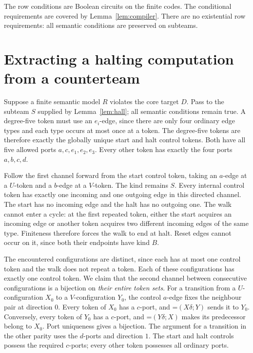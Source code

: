 \documentclass[11pt,a4paper]{article}
\newcommand{\dep}[2]{\mathord{=}(#1;#2)}
\theoremstyle{definition}
\begin{document}
The row conditions are Boolean circuits on the finite codes. The
conditional requirements are covered by Lemma~\ref{lem:compiler}.
There are no existential row requirements: all semantic conditions
are preserved on subteams.

\section{Extracting a halting computation from a counterteam}
\label{sec:soundness}
Suppose a finite semantic model $R$ violates the core target $D$.
Pass to the subteam $S$ supplied by Lemma~\ref{lem:hall}; all semantic
conditions remain true. A degree-five token must use an $e_i$-edge,
since there are only four ordinary edge types and each type occurs
at most once at a token. The degree-five tokens are therefore exactly
the globally unique start and halt control tokens. Both have all five
allowed ports $a,c,e_1,e_2,e_3$. Every other token has exactly the
four ports $a,b,c,d$.

Follow the first channel forward from the start control token, taking
an $a$-edge at a $U$-token and a $b$-edge at a $V$-token. The kind
remains $S$. Every internal control token has exactly one incoming
and one outgoing edge in this directed channel. The start has no
incoming edge and the halt has no outgoing one. The walk cannot
enter a cycle: at the first repeated token, either the start acquires
an incoming edge or another token acquires two different incoming
edges of the same type. Finiteness therefore forces the walk to end
at halt. Reset edges cannot occur on it, since both their endpoints
have kind $B$.

The encountered configurations are distinct, since each has at most
one control token and the walk does not repeat a token. Each of these
configurations has exactly one control token. We claim that the
second channel between consecutive configurations is a bijection on
\emph{their entire token sets}. For a transition from a $U$-configuration
$X_0$ to a $V$-configuration $Y_0$, the control $a$-edge fixes the
neighbour pair at direction $0$. Every token of $X_0$ has a $c$-port,
and $\dep{X\delta}Y$ sends it to $Y_0$. Conversely, every token of
$Y_0$ has a $c$-port, and $\dep{Y\delta}X$ makes its predecessor
belong to $X_0$. Port uniqueness gives a bijection. The argument for
a transition in the other parity uses the $d$-ports and direction $1$.
The start and halt controls possess the required $c$-ports; every
other token possesses all ordinary ports.
\end{document}
